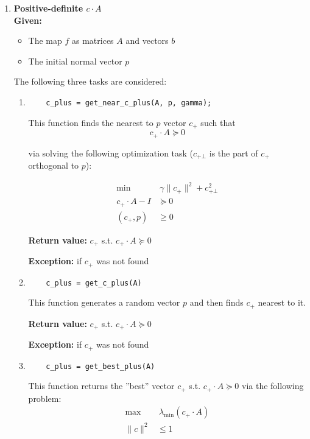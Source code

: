 \documentclass[a4paper]{article}
\theoremstyle{definition}
\begin{document}
\begin{enumerate}
\begin{enumerate}
	{\bf Return value:} $1$ if $F$ is nonconvex
	
	{\bf Exception:} on uncertain case if $c$ was not found or optimization failed
\end{enumerate}

\item {\bf Positive-definite $c\cdot A$}\\
{\bf Given:}
\begin{itemize}
	\item The map $f$ as matrices $A$ and vectors $b$
	\item The initial normal vector $p$
\end{itemize}
The following three tasks are considered:
\begin{enumerate}
	\item \begin{verbatim}
	c_plus = get_near_c_plus(A, p, gamma);
	\end{verbatim}

	This function finds the nearest to $p$ vector $c_+$ such that
	$$c_+\cdot A\succeq 0$$
	
	via solving the following optimization task ($c_{+\bot}$ is the part of $c_+$ orthogonal to $p$):

\begin{align}
\min & ~\gamma \|c_+\|^2+c^2_{+\bot} \nonumber\\
c_+\cdot A-I&  \succeq 0 \nonumber\\
(c_+, p) & \geqslant 0 \nonumber
\end{align}

	{\bf Return value:}  $c_+$ s.t. $c_+\cdot A\succeq 0$
	
	{\bf Exception:} if $c_+$ was not found
	
	\item \begin{verbatim}
	c_plus = get_c_plus(A)
	\end{verbatim}
	
	This function generates a random vector $p$ and then finds $c_+$ nearest to it.
	
	{\bf Return value:} $c_+$ s.t. $c_+\cdot A\succeq 0$
	
	{\bf Exception:} if $c_+$ was not found
	
	\item \begin{verbatim}
	c_plus = get_best_plus(A)
	\end{verbatim}
	
	This function returns the ''best'' vector $c_+$ s.t. $c_+\cdot A\succeq 0$ via the following problem:
\begin{align}
\max & ~\lambda_{\min}(c_+\cdot A) \nonumber\\
\|c\|^2&  \leqslant 1 \nonumber
\end{align}
	

\end{enumerate}
\end{enumerate}
\end{document}
